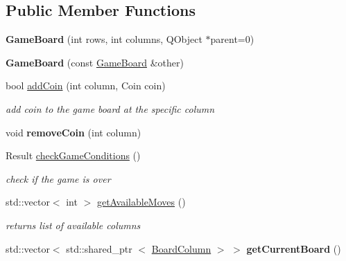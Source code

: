 \subsection*{\-Public \-Member \-Functions}
\begin{DoxyCompactItemize}
\item 
\hypertarget{classGameBoard_ae9975214e1b9b33c8d796937aa42520e}{{\bfseries \-Game\-Board} (int rows, int columns, \-Q\-Object $\ast$parent=0)}\label{classGameBoard_ae9975214e1b9b33c8d796937aa42520e}

\item 
\hypertarget{classGameBoard_ac3f19f16873e19e03d56b06ced39792c}{{\bfseries \-Game\-Board} (const \hyperlink{classGameBoard}{\-Game\-Board} \&other)}\label{classGameBoard_ac3f19f16873e19e03d56b06ced39792c}

\item 
bool \hyperlink{classGameBoard_a706ae720beb9de8147298676dc75283c}{add\-Coin} (int column, \-Coin coin)
\begin{DoxyCompactList}\small\item\em add coin to the game board at the specific column \end{DoxyCompactList}\item 
\hypertarget{classGameBoard_a99daa5b67393b74abddfd293b17a2acb}{void {\bfseries remove\-Coin} (int column)}\label{classGameBoard_a99daa5b67393b74abddfd293b17a2acb}

\item 
\hypertarget{classGameBoard_a72290b30d47b27d1a929150cd9d16305}{\-Result \hyperlink{classGameBoard_a72290b30d47b27d1a929150cd9d16305}{check\-Game\-Conditions} ()}\label{classGameBoard_a72290b30d47b27d1a929150cd9d16305}

\begin{DoxyCompactList}\small\item\em check if the game is over \end{DoxyCompactList}\item 
\hypertarget{classGameBoard_ad2c44e434b52ccb41d4b272b498cbbac}{std\-::vector$<$ int $>$ \hyperlink{classGameBoard_ad2c44e434b52ccb41d4b272b498cbbac}{get\-Available\-Moves} ()}\label{classGameBoard_ad2c44e434b52ccb41d4b272b498cbbac}

\begin{DoxyCompactList}\small\item\em returns list of available columns \end{DoxyCompactList}\item 
\hypertarget{classGameBoard_ae90c2043ae979dc35dea08113bac278a}{std\-::vector$<$ std\-::shared\-\_\-ptr\*
$<$ \hyperlink{classBoardColumn}{\-Board\-Column} $>$ $>$ {\bfseries get\-Current\-Board} ()}\label{classGameBoard_ae90c2043ae979dc35dea08113bac278a}


\end{DoxyCompactItemize}
